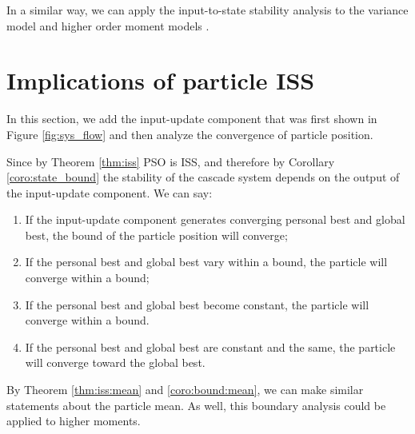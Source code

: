 \documentclass{sig-alternate}
\begin{document}
In a similar way, we can apply the input-to-state stability analysis to the variance model \cite{Jiang20078} and higher order moment models \cite{Poli:2007:EAS:1276958.1276977}.

\section{Implications of particle ISS}
\label{sec:sys_dynamics}


In this section, we add the input-update component that was first shown in Figure \ref{fig:sys_flow} and then analyze the convergence of particle position.


Since by Theorem \ref{thm:iss} PSO is ISS, and therefore by Corollary \ref{coro:state_bound} the stability of the cascade system depends on the output of the input-update component. 
We can say:
\begin{enumerate}
\item If the input-update component generates converging personal best and global best, the bound of the particle position will converge;
\item If the personal best and global best vary within a bound, the particle will converge within a bound;
\item If the personal best and global best become constant, the particle will converge within a bound.
\item If the personal best and global best are constant and the same, the particle will converge toward the global best.
\end{enumerate}
By Theorem \ref{thm:iss:mean} and \ref{coro:bound:mean}, we can make similar statements about the particle mean.
As well, this boundary analysis could be applied to higher moments.
\end{document}
